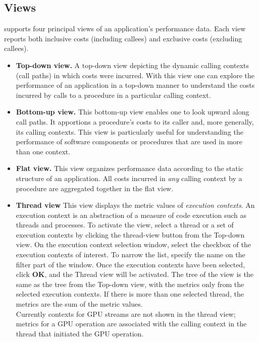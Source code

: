 \documentclass[english]{article}
\begin{document}
\subsection{Views}

 supports four principal views of an application's performance data.
Each view reports both inclusive costs (including callees) and exclusive costs (excluding callees).

\begin{itemize}

\item \textbf{Top-down view.}
A top-down view depicting the dynamic calling contexts (call paths) in which costs were incurred.
With this view one can explore the performance of an application in a top-down manner
to understand the costs incurred by calls to a procedure in a particular calling context.

\item \textbf{Bottom-up view.}
This bottom-up view enables one to look upward along call paths.
It apportions a procedure's costs to its caller and, more generally,
its calling contexts.
This view is particularly useful for understanding the performance of software components or procedures
that are used in more than one context.

\item \textbf{Flat view.}
This view organizes performance data according to the static structure of an application.
All costs incurred in \emph{any} calling context by a procedure are aggregated together in the flat view.

\item \textbf{Thread view}
        This view displays the metric values of \emph{execution contexts}.
An execution context is an abstraction of a measure of code execution such as threads and processes.
To activate the view, select a thread or a set of execution contexts by clicking the thread-view button from the Top-down view.
On the execution context selection window, select the checkbox of the execution contexts of interest.
To  narrow the list, specify the name on the filter part of the window.
Once the execution contexts have been selected, click \textbf{OK}, and the Thread view will be activated.
The tree of the view is the same as the tree from the Top-down view, with the metrics only from the selected execution contexts.
If there is more than one selected thread, the metrics are the sum of the metric values.
\\
Currently contexts for GPU streams are not shown in the thread view; metrics for a GPU operation are associated with the calling context in the thread that initiated the GPU operation.


\end{itemize}
\end{document}
